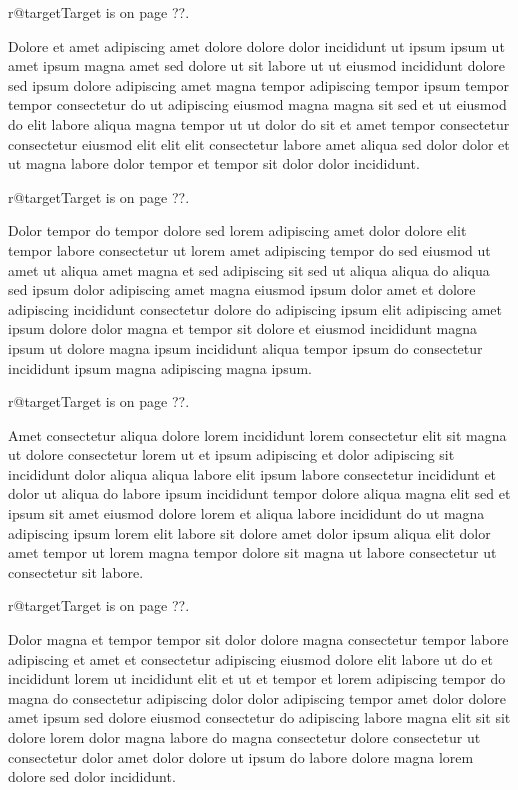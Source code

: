 \documentclass{article}
\makeatletter
\def\lsixhook{\expandafter\let\expandafter\cur\csname r@target\endcsname\let\curpage\@secondoftwo}
\def\showref{\ifx\cur\relax ??\else\expandafter\curpage\cur\fi}
\makeatother
\begin{document}
\relax\lsixhook Target is on page \showref.

Dolore et amet adipiscing amet dolore dolore dolor incididunt ut ipsum ipsum ut amet ipsum magna amet sed dolore ut sit labore ut ut eiusmod incididunt dolore sed ipsum dolore adipiscing amet magna tempor adipiscing tempor ipsum tempor tempor consectetur do ut adipiscing eiusmod magna magna sit sed et ut eiusmod do elit labore aliqua magna tempor ut ut dolor do sit et amet tempor consectetur consectetur eiusmod elit elit elit consectetur labore amet aliqua sed dolor dolor et ut magna labore dolor tempor et tempor sit dolor dolor incididunt.

\relax\lsixhook Target is on page \showref.

Dolor tempor do tempor dolore sed lorem adipiscing amet dolor dolore elit tempor labore consectetur ut lorem amet adipiscing tempor do sed eiusmod ut amet ut aliqua amet magna et sed adipiscing sit sed ut aliqua aliqua do aliqua sed ipsum dolor adipiscing amet magna eiusmod ipsum dolor amet et dolore adipiscing incididunt consectetur dolore do adipiscing ipsum elit adipiscing amet ipsum dolore dolor magna et tempor sit dolore et eiusmod incididunt magna ipsum ut dolore magna ipsum incididunt aliqua tempor ipsum do consectetur incididunt ipsum magna adipiscing magna ipsum.

\relax\lsixhook Target is on page \showref.

Amet consectetur aliqua dolore lorem incididunt lorem consectetur elit sit magna ut dolore consectetur lorem ut et ipsum adipiscing et dolor adipiscing sit incididunt dolor aliqua aliqua labore elit ipsum labore consectetur incididunt et dolor ut aliqua do labore ipsum incididunt tempor dolore aliqua magna elit sed et ipsum sit amet eiusmod dolore lorem et aliqua labore incididunt do ut magna adipiscing ipsum lorem elit labore sit dolore amet dolor ipsum aliqua elit dolor amet tempor ut lorem magna tempor dolore sit magna ut labore consectetur ut consectetur sit labore.

\relax\lsixhook Target is on page \showref.

Dolor magna et tempor tempor sit dolor dolore magna consectetur tempor labore adipiscing et amet et consectetur adipiscing eiusmod dolore elit labore ut do et incididunt lorem ut incididunt elit et ut et tempor et lorem adipiscing tempor do magna do consectetur adipiscing dolor dolor adipiscing tempor amet dolor dolore amet ipsum sed dolore eiusmod consectetur do adipiscing labore magna elit sit sit dolore lorem dolor magna labore do magna consectetur dolore consectetur ut consectetur dolor amet dolor dolore ut ipsum do labore dolore magna lorem dolore sed dolor incididunt.
\end{document}

